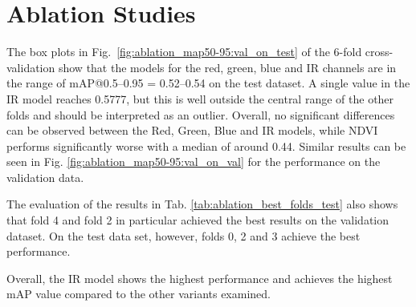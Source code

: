 
\FloatBarrier






\section{Ablation Studies}

The box plots in Fig.~\ref{fig:ablation_map50-95:val_on_test} of the 6-fold cross-validation show that the models for the red, green, blue and IR channels are in the range of \acrshort{mAP}@0.5--0.95 = 0.52–0.54 on the test dataset. A single value in the IR model reaches 0.5777, but this is well outside the central range of the other folds and should be interpreted as an outlier. Overall, no significant differences can be observed between the Red, Green, Blue and IR models, while NDVI performs significantly worse with a median of around 0.44. Similar results can be seen in Fig. \ref{fig:ablation_map50-95:val_on_val} for the performance on the validation data.

The evaluation of the results in Tab. \ref{tab:ablation_best_folds_test} also shows that fold 4 and fold 2 in particular achieved the best results on the validation dataset. On the test data set, however, folds 0, 2 and 3 achieve the best performance.  

Overall, the IR model shows the highest performance and achieves the highest \acrshort{mAP} value compared to the other variants examined.




